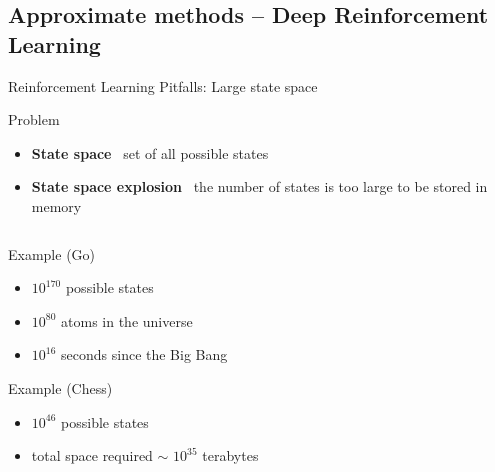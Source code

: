 \documentclass[presentation, 9pt]{beamer}\mode<presentation>{\usetheme{AMSBolognaFC}}
\begin{document}
\subsection{Approximate methods -- Deep Reinforcement Learning}
\begin{frame}{Reinforcement Learning Pitfalls: Large state space}
\begin{block}{Problem}
	\begin{itemize}
		\item \textbf{State space} \faArrowRight \, set of all possible states
		\item \textbf{State space explosion} \faArrowRight \, the number of states is too large to be stored in memory
	\end{itemize}
\end{block}
\begin{columns}
	\begin{column}{0.5\textwidth}
		
			\begin{block}{Example (Go) \, \href{}{\faLink}}
				\begin{itemize}
					\item $10^{170}$ possible states \bold{(!!!!)}
					\item $10^{80}$ atoms in the universe
					\item $10^{16}$ seconds since the Big Bang
				\end{itemize}
			\end{block}
			\begin{block}{Example (Chess) \, \href{}{\faLink}}
				\begin{itemize}
					\item $10^{46}$ possible states
					\item total space required $\sim$ $10^{35}$ terabytes
				\end{itemize}
			\end{block}
	\end{column}
	\begin{column}{0.5\textwidth}
	\centering
	\end{column}
\end{columns}


\end{frame}
\end{document}
